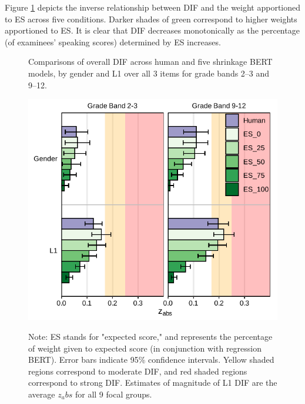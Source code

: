 \documentclass [PhD] {uclathes}
\begin{document}
Figure \ref{fig:shrinkBERT_zabs_ovr} depicts the inverse relationship between DIF and the weight apportioned to ES across five conditions. Darker shades of green correspond to higher weights apportioned to ES. It is clear that DIF decreases monotonically as the percentage (of examinees’ speaking scores) determined by ES increases. 

\begin{figure}[!htb]
    \centering
    \caption{Comparisons of overall DIF across human and five shrinkage BERT models, by gender and L1 over all 3 items for grade bands 2–3 and 9–12.}    
    \includegraphics[width=4.5in]{figures/20230425_ETS-DIF_ES_zabs_ovr_edit.pdf}
    \label{fig:shrinkBERT_zabs_ovr}
\caption*{\small Note: ES stands for "expected score," and represents the percentage of weight given to expected score (in conjunction with regression BERT). Error bars indicate 95\% confidence intervals. Yellow shaded regions correspond to moderate DIF, and red shaded regions correspond to strong DIF. Estimates of magnitude of L1 DIF are the average $z_abs$ for all 9 focal groups.}
\end{figure}
\end{document}
